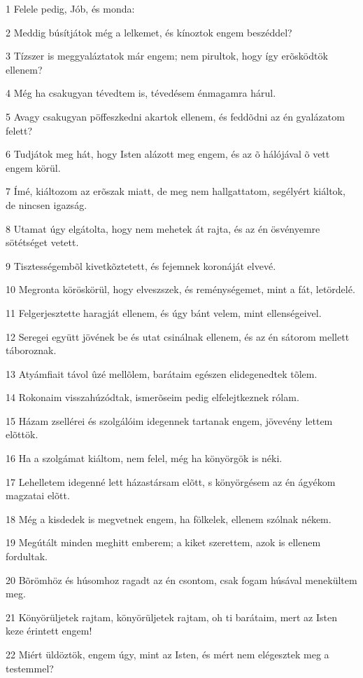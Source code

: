 \par 1 Felele pedig, Jób, és monda:
\par 2 Meddig búsítjátok még a lelkemet, és kínoztok engem beszéddel?
\par 3 Tízszer is meggyaláztatok már engem; nem pirultok, hogy így erõsködtök ellenem?
\par 4 Még ha csakugyan tévedtem is, tévedésem énmagamra hárul.
\par 5 Avagy csakugyan pöffeszkedni akartok ellenem, és feddõdni az én gyalázatom felett?
\par 6 Tudjátok meg hát, hogy Isten alázott meg engem, és az õ hálójával õ vett engem körül.
\par 7 Ímé, kiáltozom az erõszak miatt, de meg nem hallgattatom, segélyért kiáltok, de nincsen igazság.
\par 8 Utamat úgy elgátolta, hogy nem mehetek át rajta, és az én ösvényemre sötétséget vetett.
\par 9 Tisztességembõl kivetkõztetett, és fejemnek koronáját elvevé.
\par 10 Megronta köröskörül, hogy elveszszek, és reménységemet, mint a fát, letördelé.
\par 11 Felgerjesztette haragját ellenem, és úgy bánt velem, mint ellenségeivel.
\par 12 Seregei együtt jövének be és utat csinálnak ellenem, és az én sátorom mellett táboroznak.
\par 13 Atyámfiait távol ûzé mellõlem, barátaim egészen elidegenedtek tõlem.
\par 14 Rokonaim visszahúzódtak, ismerõseim pedig elfelejtkeznek rólam.
\par 15 Házam zsellérei és szolgálóim idegennek tartanak engem, jövevény lettem elõttök.
\par 16 Ha a szolgámat kiáltom, nem felel, még ha könyörgök is néki.
\par 17 Lehelletem idegenné lett házastársam elõtt, s könyörgésem az én ágyékom magzatai elõtt.
\par 18 Még a kisdedek is megvetnek engem, ha fölkelek, ellenem szólnak nékem.
\par 19 Megútált minden meghitt emberem; a kiket szerettem, azok is ellenem fordultak.
\par 20 Bõrömhöz és húsomhoz ragadt az én csontom, csak fogam húsával menekültem meg.
\par 21 Könyörüljetek rajtam, könyörüljetek rajtam, oh ti barátaim, mert az Isten keze érintett engem!
\par 22 Miért üldöztök, engem úgy, mint az Isten, és mért nem elégesztek meg a  testemmel?
